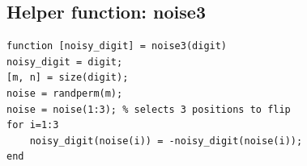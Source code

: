\documentclass[11pt, a4paper]{article}
\begin{document}
\begin{appendices}
\subsection{Helper function: noise3}
\begin{lstlisting}
function [noisy_digit] = noise3(digit)
noisy_digit = digit;
[m, n] = size(digit);
noise = randperm(m);
noise = noise(1:3); % selects 3 positions to flip
for i=1:3
    noisy_digit(noise(i)) = -noisy_digit(noise(i));
end
\end{lstlisting}
\end{appendices}
\end{document}
